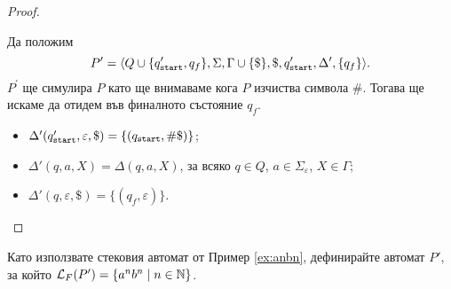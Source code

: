 \begin{proof}
\begin{enumerate}[1)]
    Да положим
    \[P^\prime = \langle{Q\cup\{q_{\texttt{start}}',q_f\}, \Sigma, \Gamma \cup \{\$\}, \$, q_{\texttt{start}}', \Delta^\prime, \{q_f\}}\rangle.\]
    $P^\prime$ ще симулира $P$ като ще внимаваме кога $P$ изчиства символа $\#$. Тогава ще искаме да отидем във финалното състояние $q_f$.
    \begin{itemize}
    \item 
      $\Delta'(q_{\texttt{start}}',\varepsilon,\$) = \{(q_{\texttt{start}}, \#\$)\}$;
    \item
      $\Delta'(q,a,X) = \Delta(q,a,X)$, за всяко $q \in Q$, $a \in \Sigma_\varepsilon$, $X \in \Gamma$;
    \item
      $\Delta'(q,\varepsilon,\$) = \{(q_f,\varepsilon)\}$.
    \end{itemize}
  \end{enumerate}
\end{proof}

\begin{problem}
  Като използвате стековия автомат от Пример \ref{ex:anbn}, дефинирайте автомат $P'$, за който
  $\mathcal{L}_F(P') = \{a^nb^n \mid n\in\mathbb{N}\}$.
\end{problem}

